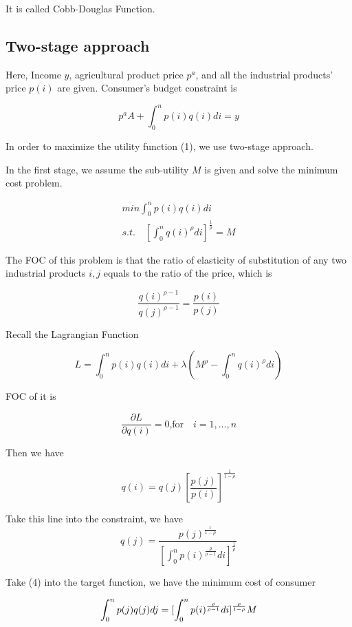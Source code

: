 \documentclass{article}
\begin{document}
It is called Cobb-Douglas Function.

\subsection{Two-stage approach}

Here, Income $y$, agricultural product price $p^a$, and all the industrial products' price $p(i)$ are given. Consumer's budget constraint is 

$$p^a A + \int_0^n p(i)q(i)di = y$$

In order to maximize the utility function (1), we use two-stage approach.

In the first stage, we assume the sub-utility $M$ is given and solve the minimum cost problem.

\begin{equation}
    \begin{aligned}
     min \int_0^n p(i)q(i)di \\
    s. t.  \quad [\int_0^n q(i)^{\rho} di]^\frac{1}{\rho} = M
    \end{aligned}
\end{equation}

The FOC of this problem is that the ratio of elasticity of substitution of any two industrial products $i,j$ equals to the ratio of the price, which is

$$\frac{q(i)^{\rho -1}}{q(j)^{\rho- 1}} = \frac{p(i)}{p(j)}$$

Recall the Lagrangian Function

$$L=\int_0^n p(i)q(i)di + \lambda(M^{\rho} - \int_0^n q(i)^{\rho} di)$$

FOC of it is 

$$\frac{\partial L}{\partial q(i) } = 0 \text{,for} \quad  i= 1,\ldots, n $$

Then we have 

$$q(i) = q(j) [\frac{p(j)}{p(i)}]^{\frac{1}{1-\rho }}$$

Take this line into the constraint, we have 
\begin{equation}
    q(j)= \frac{p(j)^{\frac{1}{1-\rho}}}{[\int_0^n p(i)^{\frac{\rho}{\rho -1}}di]^{\frac{1}{\rho}}}
\end{equation}

Take (4) into the target function, we have the minimum cost of consumer

\begin{equation}
    \notag
    \int_0^n p(j)q(j)dj = [\int_0^n p(i)^{\frac{\rho}{\rho -1}}di]^{\frac{\rho}{1-\rho}}M
\end{equation}
\end{document}
